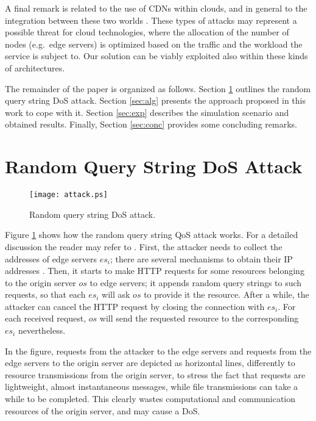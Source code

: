 \documentclass{IEEEtran}
\begin{document}
A final remark is related to the use of CDNs within clouds, and in general to the integration between these two worlds \cite{Broberg:2009,Chiu:2010}. These types of attacks may represent a possible threat for cloud technologies, where the allocation of the number of nodes (e.g.~edge servers) is optimized based on the traffic and the workload the service is subject to. Our solution can be viably exploited also within these kinds of architectures.

The remainder of the paper is organized as follows. Section \ref{sec:attack} outlines the random query string DoS attack. Section \ref{sec:alg} presents the approach proposed in this work to cope with it. Section \ref{sec:exp} describes the simulation scenario and obtained results.
Finally, Section \ref{sec:conc} provides some concluding remarks.

\section{Random Query String DoS Attack}
\label{sec:attack}

\begin{figure}[t]
   \centering
   \texttt{[image: attack.ps]}
   \caption{Random query string DoS attack.}
   \label{fig:attack}
\end{figure}

Figure \ref{fig:attack} shows how the random query string QoS attack works. For a detailed discussion the reader may refer to \cite{original}. First, the attacker needs to collect the addresses of edge servers $es_i$; there are several mechanisms to obtain their IP addresses \cite{Su:2006,original}. Then, it starts to make HTTP requests for some resources belonging to the origin server $os$ to edge servers; it appends random query strings to such requests, so that each $es_i$ will ask $os$ to provide it the resource. After a while, the attacker can cancel the HTTP request by closing the connection with $es_i$. For each received request, $os$ will send the requested resource to the corresponding $es_i$ nevertheless.

In the figure, requests from the attacker to the edge servers and requests from the edge servers to the origin server are depicted as horizontal lines, differently to resource transmissions from the origin server, to stress the fact that requests are lightweight, almost instantaneous messages, while file transmissions can take a while to be completed. This clearly wastes computational and communication resources of the origin server, and may cause a DoS.
\end{document}
